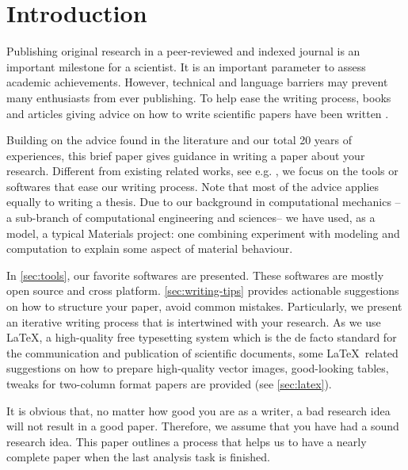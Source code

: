 \documentclass[authoryear,3p,times,preprint,review,fleqn]{elsarticle}
\numberwithin{equation}{section}
\theoremstyle{remark}
\begin{document}
\tableofcontents

\section{Introduction}

\showthe\textwidth %

Publishing original research in a peer-reviewed and indexed journal is an important milestone for a scientist. It is an important parameter to assess academic achievements. However, technical and language barriers may prevent many enthusiasts from ever publishing. To help ease the writing process, books and articles giving advice on how to write scientific papers have been written \citep{day1998write,ashby2000write}.

Building on the advice found in the literature and our total 20 years of experiences, this brief paper gives guidance in writing a paper about your research. Different from existing related works, see e.g. \cite{day1998write,ashby2000write}, we focus on the tools or softwares that ease our writing process. Note that most of the advice applies equally to writing a thesis. Due to our background in computational mechanics -- a sub-branch of computational engineering and sciences-- we have used, as a model, a typical Materials project: one combining experiment with modeling and computation to explain some aspect of material behaviour. 

In \cref{sec:tools}, our favorite softwares are presented. These softwares are mostly open source and cross platform. \cref{sec:writing-tips} provides actionable suggestions on how to structure your paper, avoid common mistakes.  Particularly, we present an iterative writing process that is intertwined with your research.
As we use \LaTeX, a high-quality free typesetting system which is the de facto standard for the communication and publication of scientific documents, some \LaTeX\ related suggestions on how to prepare high-quality vector images, good-looking tables, tweaks for two-column format papers are provided (see \cref{sec:latex}).

It is obvious that, no matter how good you are as a writer, a bad research idea will not result in a good paper. Therefore, we  assume that you have had a  sound research idea. This paper outlines a process that helps us to have a nearly complete paper when the last analysis task is finished.  
\end{document}
